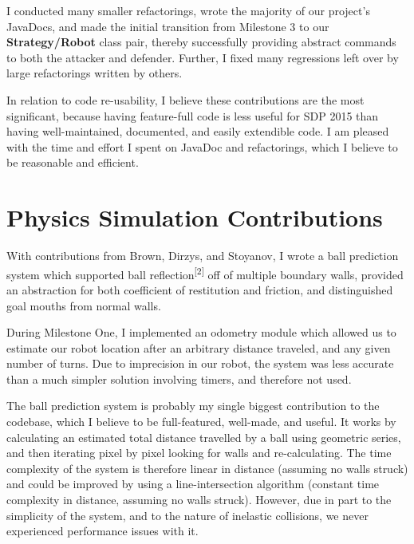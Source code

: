 \documentclass[a4paper,11pt]{article}
\begin{document}
I conducted many smaller refactorings, wrote the majority of our project's JavaDocs, and made the initial transition from Milestone 3 to our \textbf{Strategy/Robot} class pair, thereby successfully providing abstract commands to both the attacker and defender. Further, I fixed many regressions left over by large refactorings written by others.

In relation to code re-usability, I believe these contributions are the most significant, because having feature-full code is less useful for SDP 2015 than having well-maintained, documented, and easily extendible code. I am pleased with the time and effort I spent on JavaDoc and refactorings, which I believe to be reasonable and efficient.


\section{Physics Simulation Contributions}

With contributions from Brown, Dirzys, and Stoyanov, I wrote a ball prediction system which supported ball reflection\textsuperscript{[2]} off of multiple boundary walls, provided an abstraction for both coefficient of restitution and friction, and distinguished goal mouths from normal walls.

During Milestone One, I implemented an odometry module which allowed us to estimate our robot location after an arbitrary distance traveled, and any given number of turns. Due to imprecision in our robot, the system was less accurate than a much simpler solution involving timers, and therefore not used.

The ball prediction system is probably my single biggest contribution to the codebase, which I believe to be full-featured, well-made, and useful. It works by calculating an estimated total distance travelled by a ball using geometric series, and then iterating pixel by pixel looking for walls and re-calculating. The time complexity of the system is therefore linear in distance (assuming no walls struck) and could be improved by using a line-intersection algorithm (constant time complexity in distance, assuming no walls struck). However, due in part to the simplicity of the system, and to the nature of inelastic collisions, we never experienced performance issues with it.
\end{document}
